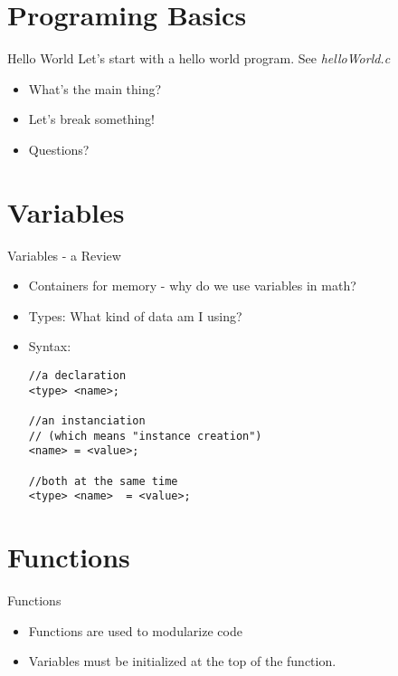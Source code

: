 \documentclass[main.tex]{subfiles}
\begin{document}
\section{Programing Basics} 
\label{sec:programing_basics}

\begin{frame}{Hello World}
	Let's start with a hello world program. See \textit{helloWorld.c}
	\begin{itemize}
		\item What's the main thing?
		\item Let's break something!
		\item Questions?
	\end{itemize}
\end{frame}

\section{Variables}
\label{sec:variables_scope_and_arrays}

\begin{frame}[fragile]{Variables - a Review}
	\begin{itemize}
		\item Containers for memory - why do we use variables in math?
		\item Types: What kind of data am I using?
		\item Syntax:
			\begin{lstlisting}
//a declaration
<type> <name>; 

//an instanciation 
// (which means "instance creation")
<name> = <value>;

//both at the same time
<type> <name>  = <value>;
			\end{lstlisting}
	\end{itemize}
\end{frame}


\section{Functions} 
\label{sec:functions}

\begin{frame}{Functions}
	\begin{itemize}
		\item Functions are used to modularize code
		\item Variables must be initialized at the top of the function.
	\end{itemize}
\end{frame}
\end{document}
